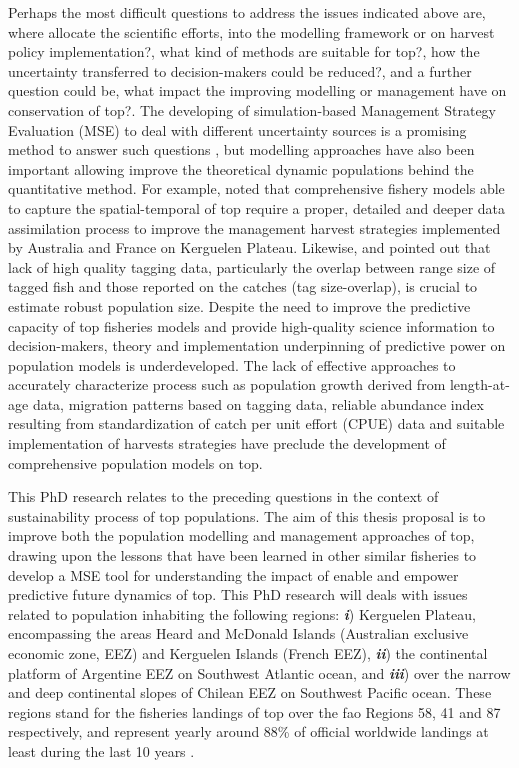 Perhaps the most difficult questions to address the issues indicated above are, where allocate the scientific efforts, into the modelling framework or on harvest policy implementation?, what kind of methods are suitable for \acl{top}?, how the uncertainty transferred to decision-makers could be reduced?, and a further question could be, what impact the improving modelling or management have on conservation of \acl{top}?. The developing of simulation-based Management Strategy Evaluation (MSE) to deal with different uncertainty sources is a promising method to answer such questions \citep{Aranda,Milner-Gulland2011}, but modelling approaches have also been important allowing improve the theoretical dynamic populations behind the quantitative method. For example, \citet{Candy2011b} noted that comprehensive fishery models able to capture the spatial-temporal of \acl{top} require a proper, detailed and deeper data assimilation process to improve the management harvest strategies implemented by Australia and France on Kerguelen Plateau. Likewise, \citet{Ziegler2013} and \citet{wyz2013} pointed out that lack of high quality tagging data, particularly the overlap between range size of tagged fish and those reported on the catches (tag size-overlap), is crucial to estimate robust population size. Despite the need to improve the predictive capacity of \acl{top} fisheries models and provide high-quality science information to decision-makers, theory and implementation underpinning of predictive power on population models is underdeveloped. The lack of effective approaches to accurately characterize process such as population growth derived from length-at-age data, migration patterns based on tagging data, reliable abundance index resulting from standardization of catch per unit effort (CPUE) data and suitable implementation of harvests strategies have preclude the development of comprehensive population models on \acl{top}. 

This PhD research relates to the preceding questions in the context of sustainability process of \acl{top} populations. The aim of this thesis  proposal is to improve both the population modelling and management approaches of \acl{top}, drawing upon the lessons that have been learned in other similar fisheries to develop a MSE tool for understanding the impact of enable and empower predictive future dynamics of \acl{top}. This PhD research will deals with issues related to population inhabiting the following regions: \emph{\textbf{i}}) Kerguelen Plateau, encompassing the areas Heard and McDonald Islands (Australian exclusive economic zone, EEZ) and Kerguelen Islands (French EEZ), \emph{\textbf{ii}}) the continental platform of Argentine EEZ on Southwest Atlantic ocean, and \emph{\textbf{iii}}) over the narrow and deep continental slopes of Chilean EEZ on Southwest Pacific ocean. These regions stand for the fisheries landings of \acl{top} over the \ac{fao} Regions 58, 41 and 87 respectively, and represent yearly around 88\% of official worldwide landings at least during the last 10 years \citep{FAO2014}.

